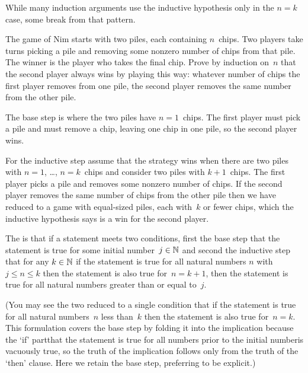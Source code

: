 \documentclass{ibl}  %
\begin{document}
\noindent
While many induction arguments use the inductive 
hypothesis only in the $n=k$ case,
some break from that pattern.

\begin{ex}
The game of Nim starts with two piles, each containing $n$~chips.
Two players take turns picking a pile and removing 
some nonzero number of chips from that pile. 
The winner is the player who takes the final chip.
Prove by induction on~$n$ that the second player always wins by
playing this way: whatever number of chips the first player removes
from one pile, the second player removes the same number from the other pile.
\begin{ans}
The base step is where the two piles have $n=1$~chips.
The first player must pick a pile and must remove a chip, leaving one chip
in one pile, so the second player wins.

For the inductive step assume that the strategy wins when there are two piles
with $n=1$, \ldots, $n=k$~chips and consider two piles with
$k+1$~chips.
The first player picks a pile and removes some nonzero number of chips.
If the second player removes the same number of chips from the other
pile then we have reduced to a game with equal-sized piles, each
with~$k$ or fewer chips, which the inductive hypothesis says
is a win for the second player.  
\end{ans}
\end{ex}

\begin{df}
The  is that if a statement
meets two conditions, first the base step that the statement is true for some
initial number~$j\in\mathbb{N}$
and second the inductive step that for any $k\in\mathbb{N}$ 
if the statement is true for 
all natural numbers $n$ with $j\leq n\leq k$ then the
statement is also true for~$n=k+1$,
then the statement is true for all natural numbers greater than or
equal to~$j$.  
\end{df}

\noindent (You may see the two reduced to a single condition that
if the statement is true for all natural numbers~$n$ less than~$k$
then the statement is also true for~$n=k$.
This formulation covers the base step by folding it into the 
implication because
the `if' part\Dash that the statement is true for all numbers prior to
the initial number\Dash is vacuously true, so the truth of the implication
follows only from the truth of the `then' clause.
Here we retain the base step, preferring to be explicit.)
\end{document}
